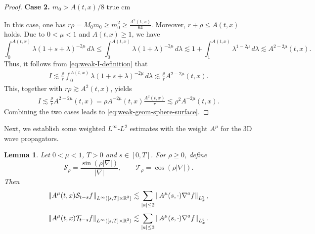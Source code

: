 \documentclass[11pt,twoside]{article}
\def\R{\mathop{\mathbb R\kern 0pt}\nolimits}
\def\ls{\lesssim}
\theoremstyle{plain}
\newtheorem{lemma}[theorem]{Lemma}
\theoremstyle{definition}
\theoremstyle{assumption}
\numberwithin{equation}{section}
\begin{document}
\begin{proof}
				\smallskip
				\noindent
				\textbf{Case 2. \(m_0>A(t,x)/8\)}
 true cm

			In this case, one has
				$
				r\rho=M_0m_0\ge m_0^2\ge \frac{A^2(t,x)}{64}.
				$
				Moreover, \(r+\rho\le A(t,x)\) holds.  Due to \(0<\mu<1\) and \(A(t,x)\ge1\), we have
				\[
				\int_0^{A(t,x)}
				\lambda(1+s+\lambda)^{-2\mu}\,d\lambda
				\le
				\int_0^{A(t,x)}
				\lambda(1+\lambda)^{-2\mu}\,d\lambda
				\lesssim
				1+\int_1^{A(t,x)} \lambda^{1-2\mu}\,d\lambda
				\ls
				A^{2-2\mu}(t,x).
				\]
				Thus, it follows from \eqref{eq:weak-I-definition} that
				\begin{equation}
					\label{eq:weak-geom-large-min-surface}
					\begin{aligned}
						I
						\lesssim
						\frac{\rho}{r}
						\int_0^{A(t,x)}
						\lambda(1+s+\lambda)^{-2\mu}\,d\lambda
						\ls
						\frac{\rho}{r}A^{2-2\mu}(t,x).
					\end{aligned}
				\end{equation}
				This, together with  \(r\rho\gtrsim A^2(t,x)\), yields
				\begin{equation}\label{eq:weak-geom-large-min-surface-1}
\begin{aligned}
				I\ls\frac{\rho}{r}A^{2-2\mu}(t,x)
				=
				\rho A^{-2\mu}(t,x)\frac{A^2(t,x)}{r}
				\ls
				\rho^2A^{-2\mu}(t,x).
				\end{aligned}
				\end{equation}
				Combining the two cases leads to \eqref{eq:weak-geom-sphere-surface}.
			\end{proof}
			
			
			Next, we establish some weighted $L^\infty$-$L^2$ estimates with the weight $A^{\mu}$ for the 3D wave propagators.
			
			
			\begin{lemma}\label{lem:weak-weighted-wave-propagators}
				Let \(0<\mu<1\), \(T>0\) and \(s\in[0,T]\).
				For \(\rho\ge0\), define
				\begin{equation*}
					\mathcal S_\rho
					=
					\frac{\sin(\rho|\nabla|)}{|\nabla|},
					\qquad
					\mathcal T_\rho
					=
					\cos(\rho|\nabla|).
				\end{equation*}
				Then
				\begin{equation}
					\label{eq:weak-S-basic}
					\left\|
					A^\mu(t,x)\mathcal S_{t-s}f
					\right\|_{L^\infty([s,T]\times\R^3)}
					\ls
					\sum_{|a|\le2}
					\left\|
					A^\mu(s,\cdot)\nabla^a f
					\right\|_{L^2_x},
				\end{equation}
				\begin{equation}
					\label{eq:weak-T-basic}
					\left\|
					A^\mu(t,x)\mathcal T_{t-s}f
					\right\|_{L^\infty([s,T]\times\R^3)}
					\ls
					\sum_{|a|\le3}
					\left\|
					A^\mu(s,\cdot)\nabla^a f
					\right\|_{L^2_x}.
				\end{equation}
			\end{lemma}
			
\end{document}
